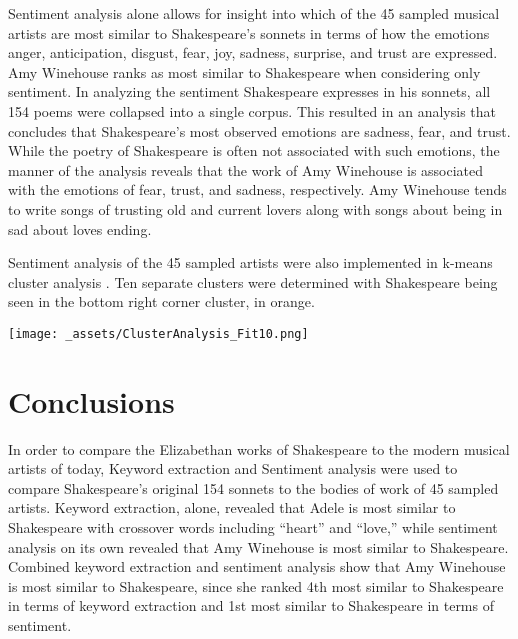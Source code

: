 \documentclass[10pt,a4paper]{article}
\begin{document}


\noindent Sentiment analysis alone allows for insight into which of the 45 sampled musical artists are most similar to Shakespeare’s sonnets in terms of how the emotions anger, anticipation, disgust, fear, joy, sadness, surprise, and trust are expressed. Amy Winehouse ranks as most similar to Shakespeare when considering only sentiment. In analyzing the sentiment Shakespeare expresses in his sonnets, all 154 poems were collapsed into a single corpus. This resulted in an analysis that concludes that Shakespeare’s most observed emotions are sadness, fear, and trust. While the poetry of Shakespeare is often not associated with such emotions, the manner of the analysis reveals that the work of Amy Winehouse is associated with the emotions of fear, trust, and sadness, respectively. Amy Winehouse tends to write songs of trusting old and current lovers along with songs about being in sad about loves ending. 

  

\noindent Sentiment analysis of the 45 sampled artists were also implemented in k-means cluster analysis . Ten separate clusters were determined with Shakespeare being seen in the bottom right corner cluster, in orange. 

\begin{center}
\texttt{[image: \_assets/ClusterAnalysis\_Fit10.png]}
\end{center}

\section{Conclusions}
In order to compare the Elizabethan works of Shakespeare to the modern musical artists of today, Keyword extraction and Sentiment analysis were used to compare Shakespeare’s original 154 sonnets to the bodies of work of 45 sampled artists. Keyword extraction, alone, revealed that Adele is most similar to Shakespeare with crossover words including “heart” and “love,” while sentiment analysis on its own revealed that Amy Winehouse is most similar to Shakespeare. Combined keyword extraction and sentiment analysis show that Amy Winehouse is most similar to Shakespeare, since she ranked 4th most similar to Shakespeare in terms of keyword extraction and 1st most similar to Shakespeare in terms of sentiment. 
\end{document}
